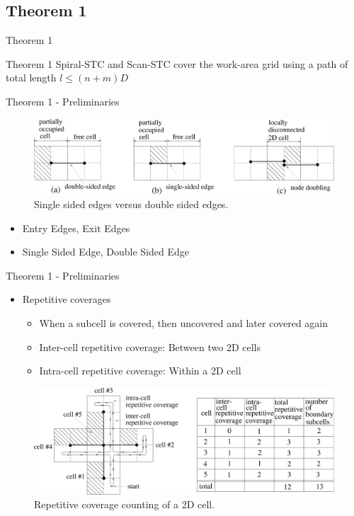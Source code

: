 \documentclass{beamer}
\begin{document}
\subsection{Theorem 1}
\begin{frame}{Theorem 1}
    \begin{block}{Theorem 1}
        Spiral-STC and Scan-STC cover the work-area grid using a path of total length $l \leq (n + m)D$
    \end{block}
\end{frame}
\begin{frame}{Theorem 1 - Preliminaries}
    \begin{figure}
        \includegraphics[width=\linewidth]{Images/inv_fig4.png}
        \caption{Single sided edges versus double sided edges.}
    \end{figure}
    \begin{itemize}
        \item Entry Edges, Exit Edges
        \item Single Sided Edge, Double Sided Edge
    \end{itemize}
\end{frame}

\begin{frame}{Theorem 1 - Preliminaries}
    \begin{itemize}
        \item Repetitive coverages
              \begin{itemize}
                  \item When a subcell is covered, then uncovered and later covered again
                  \item Inter-cell repetitive coverage: Between two 2D cells
                  \item Intra-cell repetitive coverage: Within a 2D cell
              \end{itemize}
    \end{itemize}
    \begin{figure}
        \includegraphics[width=0.8\linewidth]{Images/inv_fig9.png}
        \caption{Repetitive coverage counting of a 2D cell.}
    \end{figure}
\end{frame}
\end{document}
